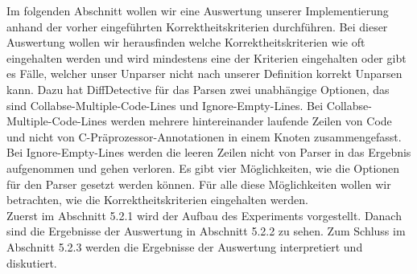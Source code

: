 Im folgenden Abschnitt wollen wir eine Auswertung unserer Implementierung anhand der vorher eingeführten Korrektheitskriterien durchführen. Bei dieser Auswertung wollen wir herausfinden welche Korrektheitskriterien wie oft eingehalten werden und wird mindestens eine der Kriterien eingehalten oder gibt es Fälle, welcher unser Unparser nicht nach unserer Definition korrekt Unparsen kann. Dazu hat DiffDetective für das Parsen zwei unabhängige Optionen, das sind Collabse-Multiple-Code-Lines und Ignore-Empty-Lines. Bei Collabse-Multiple-Code-Lines werden mehrere hintereinander laufende Zeilen von Code und nicht von C-Präprozessor-Annotationen in einem Knoten zusammengefasst. Bei Ignore-Empty-Lines werden die leeren Zeilen nicht von Parser in das Ergebnis aufgenommen und gehen verloren. Es gibt vier Möglichkeiten, wie die Optionen für den Parser gesetzt werden können. Für alle diese Möglichkeiten wollen wir betrachten, wie die Korrektheitskriterien eingehalten werden.\\

Zuerst im Abschnitt 5.2.1 wird der Aufbau des Experiments vorgestellt. Danach sind die Ergebnisse der Auswertung in Abschnitt 5.2.2 zu sehen. Zum Schluss im Abschnitt 5.2.3 werden die Ergebnisse der Auswertung interpretiert und diskutiert.



